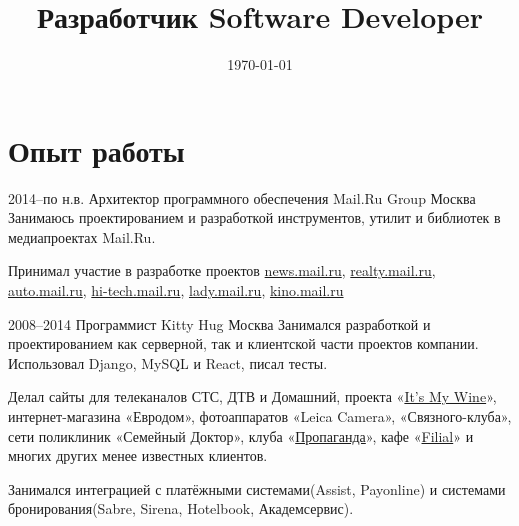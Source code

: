 \documentclass[11pt,a4paper,sans]{moderncv}
\title
    {\lang
        {Разработчик}
        {Software Developer}}
\date{\today}
\newcommand{\lang}[2]{#1}
\begin{document}
\makecvtitle


\section
    {\lang
        {Опыт работы}
        {Work Experience}}


\cventry
    {2014--\lang
        {по н.в.}
        {Present}}
    {\lang
        {Архитектор программного обеспечения}
        {Software Architect}}
    {Mail.Ru Group}
    {\lang
        {Москва}
        {Moscow}}
    {}
    {\lang
        {Занимаюсь проектированием и разработкой инструментов, утилит и библиотек в медиапроектах Mail.Ru.}
        {Design and develop tools, utilities and libraries for Media Projects Mail.Ru}}

\cvlistitem
    {\lang 
        {Принимал участие в разработке проектов \href{https://news.mail.ru}{news.mail.ru}, \href{https://realty.mail.ru}{realty.mail.ru}, \href{https://auto.mail.ru}{auto.mail.ru}, \href{https://hi-tech.mail.ru}{hi-tech.mail.ru}, \href{https://lady.mail.ru}{lady.mail.ru}, \href{https://kino.mail.ru}{kino.mail.ru}}
        {Actively participated in development of such projects as \href{https://news.mail.ru}{news.mail.ru}, \href{https://realty.mail.ru}{realty.mail.ru}, \href{https://auto.mail.ru}{auto.mail.ru}, \href{https://hi-tech.mail.ru}{hi-tech.mail.ru}, \href{https://lady.mail.ru}{lady.mail.ru}, \href{https://kino.mail.ru}{kino.mail.ru}}\newline}


\cventry
    {2008--2014}
    {\lang
        {Программист}
        {Software Developer}}
    {Kitty Hug}
    {\lang
        {Москва}
        {Moscow}}
    {}
    {\lang
        {Занимался разработкой и проектированием как серверной, так и клиентской части проектов компании. Использовал Django, MySQL и React, писал тесты.}
        {Designed and developed ... TODO}}

\cvlistitem
    {\lang
        {Делал сайты для телеканалов СТС, ДТВ и Домашний, проекта «\href{http://itsmywine.ru}{It's My Wine}», интернет-магазина «Евродом», фотоаппаратов «Leica Camera», «Связного-клуба», сети поликлиник «Семейный Доктор», клуба «\href{http://propagandamoscow.com}{Пропаганда}», кафе «\href{http://filialmoscow.com/ru/}{Filial}» и многих других менее известных клиентов.}
        {TODO}}

\cvlistitem
    {\lang
        {Занимался интеграцией с платёжными системами(Assist, Payonline) и системами бронирования(Sabre, Sirena, Hotelbook, Академсервис).}
        {TODO}}
    
\end{document}
